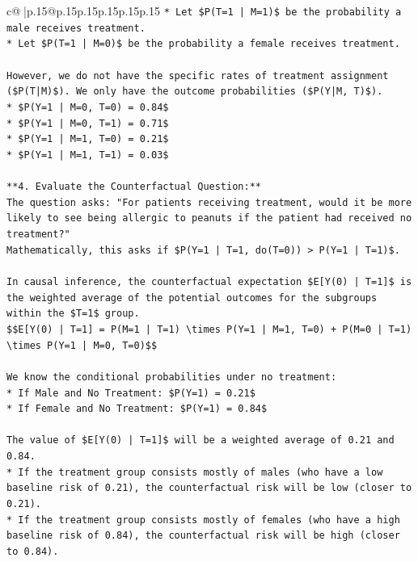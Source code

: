 \documentclass{article}
\begin{document}
{\begin{supertabular}{c@{$\;$}|p{.15\linewidth}@{}p{.15\linewidth}p{.15\linewidth}p{.15\linewidth}p{.15\linewidth}p{.15\linewidth}}
{{{\texttt{*   Let \$P(T=1 | M=1)\$ be the probability a male receives treatment.} \\
\texttt{*   Let \$P(T=1 | M=0)\$ be the probability a female receives treatment.} \\
\\ 
\texttt{However, we do not have the specific rates of treatment assignment (\$P(T|M)\$). We only have the outcome probabilities (\$P(Y|M, T)\$).} \\
\texttt{*   \$P(Y=1 | M=0, T=0) = 0.84\$} \\
\texttt{*   \$P(Y=1 | M=0, T=1) = 0.71\$} \\
\texttt{*   \$P(Y=1 | M=1, T=0) = 0.21\$} \\
\texttt{*   \$P(Y=1 | M=1, T=1) = 0.03\$} \\
\\ 
\texttt{**4. Evaluate the Counterfactual Question:**} \\
\texttt{The question asks: "For patients receiving treatment, would it be more likely to see being allergic to peanuts if the patient had received no treatment?"} \\
\texttt{Mathematically, this asks if \$P(Y=1 | T=1, do(T=0)) > P(Y=1 | T=1)\$.} \\
\\ 
\texttt{In causal inference, the counterfactual expectation \$E{[}Y(0) | T=1{]}\$ is the weighted average of the potential outcomes for the subgroups within the \$T=1\$ group.} \\
\texttt{\$\$E{[}Y(0) | T=1{]} = P(M=1 | T=1) \textbackslash{}times P(Y=1 | M=1, T=0) + P(M=0 | T=1) \textbackslash{}times P(Y=1 | M=0, T=0)\$\$} \\
\\ 
\texttt{We know the conditional probabilities under no treatment:} \\
\texttt{*   If Male and No Treatment: \$P(Y=1) = 0.21\$} \\
\texttt{*   If Female and No Treatment: \$P(Y=1) = 0.84\$} \\
\\ 
\texttt{The value of \$E{[}Y(0) | T=1{]}\$ will be a weighted average of 0.21 and 0.84.} \\
\texttt{*   If the treatment group consists mostly of males (who have a low baseline risk of 0.21), the counterfactual risk will be low (closer to 0.21).} \\
\texttt{*   If the treatment group consists mostly of females (who have a high baseline risk of 0.84), the counterfactual risk will be high (closer to 0.84).} \\
}}}
\end{supertabular}}
\end{document}
